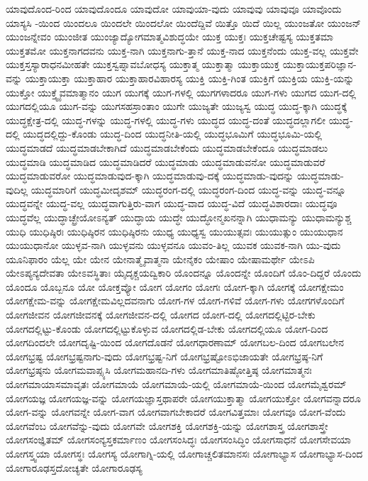{ಯಾವುದೊಂದ-ರಿಂದ
ಯಾವುದೊಂದೂ
ಯಾವುದೋ
ಯಾವುಯಾ-ವುದು
ಯಾವುವು
ಯಾವುವೂ
ಯಾವೊಂದು
ಯಾಸ್ಯಸಿ
-ಯಿಂದ
ಯಿಂದಲೂ
ಯಿಂದಲೇ
ಯಿಂದಲೋ
ಯಿಂದೆದ್ದಿವೆ
ಯಿತ್ತೊ
ಯಿದೆ
ಯಿಲ್ಲ
ಯುಂಜತೋ
ಯುಂಜನ್
ಯುಂಜನ್ನೇವಂ
ಯುಂಜೀತ
ಯುಂಜ್ಯಾದ್ಯೋಗಮಾತ್ಮವಿಶುದ್ಧಯೇ
ಯುಕ್ತ
ಯುಕ್ತಃ
ಯುಕ್ತಚೇಷ್ಟಸ್ಯ
ಯುಕ್ತತಮಾ
ಯುಕ್ತತಮೋ
ಯುಕ್ತನಾಗದವನು
ಯುಕ್ತ-ನಾಗಿ
ಯುಕ್ತನಾಗು-ತ್ತಾನೆ
ಯುಕ್ತ-ನಾದ
ಯುಕ್ತನೆಂದು
ಯುಕ್ತ-ವಲ್ಲ
ಯುಕ್ತವೇ
ಯುಕ್ತಸ್ತಸ್ಯಾರಾಧನಮೀಹತೇ
ಯುಕ್ತಸ್ವಪ್ನಾವಬೋಧಸ್ಯ
ಯುಕ್ತಾತ್ಮ
ಯುಕ್ತಾತ್ಮಾ
ಯುಕ್ತಾಯುಕ್ತ
ಯುಕ್ತಾಯುಕ್ತಪರಿಜ್ಞಾನ-ವನ್ನು
ಯುಕ್ತಾಯುಕ್ತಾ
ಯುಕ್ತಾಹಾರ
ಯುಕ್ತಾಹಾರವಿಹಾರಸ್ಯ
ಯುಕ್ತಿ
ಯುಕ್ತಿ-ಗಿಂತ
ಯುಕ್ತಿಗೆ
ಯುಕ್ತಿಯ
ಯುಕ್ತಿ-ಯನ್ನು
ಯುಕ್ತೋ
ಯುಕ್ತ್ವೈವಮಾತ್ಮಾನಂ
ಯುಗ
ಯುಗಕ್ಕೆ
ಯುಗ-ಗಳಲ್ಲಿ
ಯುಗಗಳಾದರೂ
ಯುಗ-ಗಳು
ಯುಗದ
ಯುಗ-ದಲ್ಲಿ
ಯುಗದಲ್ಲಿಯೂ
ಯುಗ-ವನ್ನು
ಯುಗಸಹಸ್ರಾಂತಾಂ
ಯುಗೇ
ಯುಜ್ಯತೇ
ಯುಜ್ಯಸ್ವ
ಯುದ್ಧ
ಯುದ್ಧ-ಕ್ಕಾಗಿ
ಯುದ್ಧಕ್ಕೆ
ಯುದ್ಧಕ್ಷೇತ್ರ-ದಲ್ಲಿ
ಯುದ್ಧ-ಗಳನ್ನು
ಯುದ್ಧ-ಗಳಲ್ಲಿ
ಯುದ್ಧ-ಗಳು
ಯುದ್ಧದ
ಯುದ್ಧ-ದಂತೆ
ಯುದ್ಧದಲ್ಲಾಗಲೀ
ಯುದ್ಧ-ದಲ್ಲಿ
ಯುದ್ಧದಲ್ಲಿದ್ದು-ಕೊಂಡು
ಯುದ್ಧ-ದಿಂದ
ಯುದ್ಧನೀತಿ-ಯಲ್ಲಿ
ಯುದ್ಧಭೂಮಿಗೆ
ಯುದ್ಧಭೂಮಿ-ಯಲ್ಲಿ
ಯುದ್ಧಮಾಡದೆ
ಯುದ್ಧಮಾಡಬೇಕಾಗಿದೆ
ಯುದ್ಧಮಾಡಬೇಕೆಂದು
ಯುದ್ಧಮಾಡಬೇಕೆಂದೂ
ಯುದ್ಧಮಾಡಲು
ಯುದ್ಧಮಾಡಿ
ಯುದ್ಧಮಾಡಿದ
ಯುದ್ಧಮಾಡಿದರೆ
ಯುದ್ಧಮಾಡು
ಯುದ್ಧಮಾಡುವನೋ
ಯುದ್ಧಮಾಡುವರೆ
ಯುದ್ಧಮಾಡುವರೋ
ಯುದ್ಧಮಾಡುವುದ-ಕ್ಕಾಗಿ
ಯುದ್ಧಮಾಡುವು-ದಕ್ಕೆ
ಯುದ್ಧಮಾಡು-ವುದನ್ನು
ಯುದ್ಧಮಾಡು-ವುದಿಲ್ಲ
ಯುದ್ಧಮಾರಿಗೆ
ಯುದ್ಧಮೀದೃಶಮ್
ಯುದ್ಧರಂಗ-ದಲ್ಲಿ
ಯುದ್ಧರಂಗ-ದಿಂದ
ಯುದ್ಧ-ವನ್ನು
ಯುದ್ಧ-ವನ್ನೂ
ಯುದ್ಧವನ್ನೇ
ಯುದ್ಧ-ವಲ್ಲ
ಯುದ್ಧವಾಗುತ್ತಿರು-ವಾಗ
ಯುದ್ಧ-ವಾದ
ಯುದ್ಧ-ವಿದೆ
ಯುದ್ಧವಿಶಾರದಾಃ
ಯುದ್ಧವೂ
ಯುದ್ಧವೆಲ್ಲ
ಯುದ್ಧಾಚ್ಛ್ರೇಯೋಽನ್ಯತ್
ಯುದ್ಧಾಯ
ಯುದ್ಧೇ
ಯುದ್ಧೋನ್ಮಖನನ್ನಾಗಿ
ಯುಧಾಮನ್ಯು
ಯುಧಾಮನ್ಯುಶ್ಚ
ಯುಧಿ
ಯುಧಿಷ್ಠಿರಃ
ಯುಧಿಷ್ಠಿರನ
ಯುಧಿಷ್ಠಿರನು
ಯುಧ್ಯ
ಯುಧ್ಯಸ್ವ
ಯುಯುತ್ಸವಃ
ಯುಯುತ್ಸುಂ
ಯುಯುಧಾನ
ಯುಯುಧಾನೋ
ಯುಳ್ಳವ-ನಾಗಿ
ಯುಳ್ಳವನು
ಯುಳ್ಳವನೂ
ಯುವಂ-ತಿಲ್ಲ
ಯುವಕ
ಯುವಕ-ನಾಗಿ
ಯು-ವುದು
ಯೂನಿಫಾರಂ
ಯೆಲ್ಲ
ಯೇ
ಯೇನ
ಯೇನಾತ್ಮೈವಾತ್ಮನಾ
ಯೇನೈಕಂ
ಯೇಷಾಂ
ಯೇಷಾಮರ್ಥೇ
ಯೇಽಪಿ
ಯೇಽಪ್ಯನ್ಯದೇವತಾ
ಯೇಽವಸ್ಥಿತಾಃ
ಯೈದೃಕ್ಚಯದ್ವಿಕಾರಿ
ಯೊಂದನ್ನೂ
ಯೊಂದನ್ನೇ
ಯೊಂದಿಗೆ
ಯೊಂ-ದಿದ್ದರೆ
ಯೊಂದು
ಯೊಂದೂ
ಯೊಬ್ಬನೂ
ಯೋ
ಯೋಕ್ತವ್ಯೋ
ಯೋಗ
ಯೋಗಂ
ಯೋಗಃ
ಯೋಗ-ಕ್ಕಾಗಿ
ಯೋಗಕ್ಕೆ
ಯೋಗಕ್ಷೇಮಂ
ಯೋಗಕ್ಷೇಮ-ವನ್ನು
ಯೋಗಕ್ಷೇಮವಿಲ್ಲದವನಾಗು
ಯೋಗ-ಗಳ
ಯೋಗ-ಗಳಿವೆ
ಯೋಗ-ಗಳು
ಯೋಗಗಳೊಂದಿಗೆ
ಯೋಗಜೀವನ
ಯೋಗಜೀವನಕ್ಕೆ
ಯೋಗಜೀವನ-ದಲ್ಲಿ
ಯೋಗದ
ಯೋಗ-ದಲ್ಲಿ
ಯೋಗದಲ್ಲಿಟ್ಟಿರ-ಬೇಕು
ಯೋಗದಲ್ಲಿಟ್ಟು-ಕೊಂಡು
ಯೋಗದಲ್ಲಿಟ್ಟುಕೊಳ್ಳುವ
ಯೋಗದಲ್ಲಿಡ-ಬೇಕು
ಯೋಗದಲ್ಲಿಯೂ
ಯೋಗ-ದಿಂದ
ಯೋಗದಿಂದಲೇ
ಯೋಗದೃಷ್ಟಿ-ಯಿಂದ
ಯೋಗದೊಡನೆ
ಯೋಗಧಾರಣಾಮ್
ಯೋಗಬಲ-ದಿಂದ
ಯೋಗಬಲೇನ
ಯೋಗಭ್ರಷ್ಟ
ಯೋಗಭ್ರಷ್ಟನಾಗು-ವುದು
ಯೋಗಭ್ರಷ್ಟ-ನಿಗೆ
ಯೋಗಭ್ರಷ್ಟೋಽಭಿಜಾಯತೇ
ಯೋಗಭ್ರಷ್ಠ-ನಿಗೆ
ಯೋಗಭ್ರಷ್ಠನು
ಯೋಗಮವಾಪ್ಸ್ಯಸಿ
ಯೋಗಮಹಾನದಿ-ಗಳು
ಯೋಗಮಾತಿಷ್ಠೋತ್ತಿಷ್ಠ
ಯೋಗಮಾತ್ಮನಃ
ಯೋಗಮಾಯಾಸಮಾವೃತಃ
ಯೋಗಮಾಯೆ
ಯೋಗಮಾಯೆ-ಯಲ್ಲಿ
ಯೋಗಮಾಯೆ-ಯಿಂದ
ಯೋಗಮೈಶ್ವರಮ್
ಯೋಗಯಜ್ಞ
ಯೋಗಯಜ್ಞ-ವನ್ನು
ಯೋಗಯಜ್ಞಾಸ್ತಥಾಪರೇ
ಯೋಗಯುಕ್ತಾತ್ಮಾ
ಯೋಗಯುಕ್ತೋ
ಯೋಗವನ್ನಾದರೂ
ಯೋಗ-ವನ್ನು
ಯೋಗವನ್ನೇ
ಯೋಗ-ವಾಗ
ಯೋಗವಾಗಬೇಕಾದರೆ
ಯೋಗವಿತ್ತಮಾಃ
ಯೋಗವೂ
ಯೋಗ-ವೆಂದು
ಯೋಗವೆಂಬ
ಯೋಗವೆನ್ನು-ವುದು
ಯೋಗವೇ
ಯೋಗಶಕ್ತಿ
ಯೋಗಶಕ್ತಿ-ಯನ್ನು
ಯೋಗಶಾಸ್ತ್ರ
ಯೋಗಶಾಸ್ತ್ರೇ
ಯೋಗಸಂಜ್ಞಿತಮ್
ಯೋಗಸಂನ್ಯಸ್ತಕರ್ಮಾಣಂ
ಯೋಗಸಂಸಿದ್ಧಃ
ಯೋಗಸಂಸಿದ್ಧಿಂ
ಯೋಗಸಾಧನೆ
ಯೋಗಸೇವಯಾ
ಯೋಗಸ್ತ್ವಯಾ
ಯೋಗಸ್ಥಃ
ಯೋಗಸ್ಯ
ಯೋಗಾಗ್ನಿ-ಯಲ್ಲಿ
ಯೋಗಾಚ್ಚಲಿತಮಾನಸಃ
ಯೋಗಾಭ್ಯಾಸ
ಯೋಗಾಭ್ಯಾಸ-ದಿಂದ
ಯೋಗಾರೂಢಸ್ತದೋಚ್ಯತೇ
ಯೋಗಾರೂಢಸ್ಯ
}

